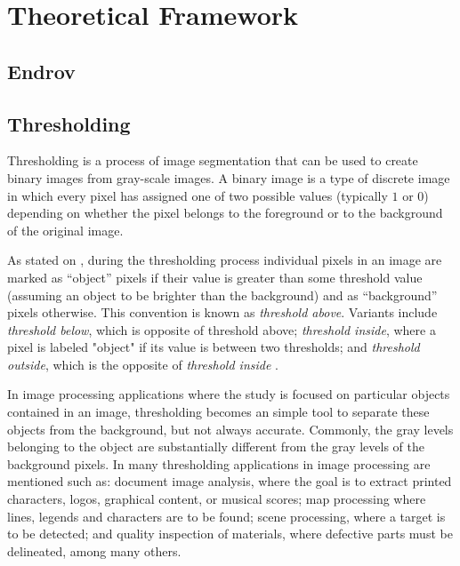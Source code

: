 \cleardoublepage
\chapter{Theoretical Framework}
\label{sec:dev}

\section{Endrov}
\label{sec:endrov}


\section{Thresholding}
\label{sec:thresholding}

Thresholding is a process of image segmentation that can be used to create
binary images from gray-scale images. A binary image is a type of discrete image in
 which every pixel has assigned one of two possible values (typically 
$1$ or $0$) depending on whether the pixel belongs
to the foreground or to the background of the original image.

As stated on \cite{web:thresholding}, during the thresholding process individual 
pixels in an image are marked as ``object'' pixels if 
their value is greater than some threshold value (assuming an object to be brighter than the 
background) and as ``background'' pixels otherwise. This convention is known as \emph{threshold above}. 
Variants include \emph{threshold below}, which is opposite of threshold above; \emph{threshold inside}, where a 
pixel is labeled "object" if its value is between two thresholds; and \emph{threshold outside}, which is 
the opposite of \emph{threshold inside} \cite{shapiro}.

In image processing applications where the study is focused on particular objects contained
in an image, thresholding becomes an simple tool to separate these objects from
the background, but not always accurate. Commonly, the gray levels belonging to the object are substantially
different from the gray levels of the background pixels. In \cite[p.146]{thres} many thresholding
applications in image processing are mentioned such as: document image analysis, where the goal
is to extract printed characters, logos, graphical content, or musical scores; map processing
where lines, legends and characters are to be found; scene processing, where a target is to
be detected; and quality inspection of materials, where defective parts must be delineated,
among many others. \\

